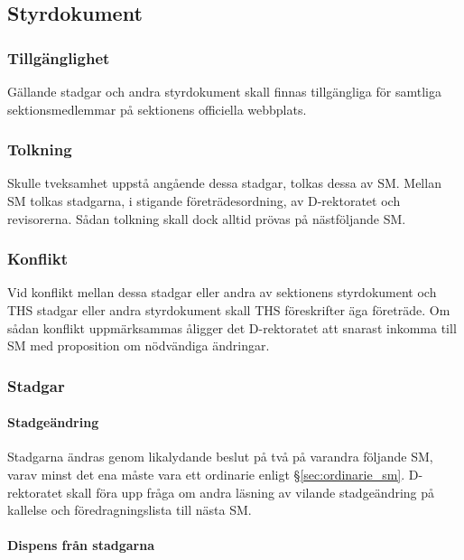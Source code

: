 \documentclass{dgovdoc}
\begin{document}
\subsection{Styrdokument}
\label{sec:styrdokument}

\subsubsection{Tillgänglighet}

Gällande stadgar och andra styrdokument skall finnas tillgängliga för samtliga
sektionsmedlemmar på sektionens officiella webbplats.

\subsubsection{Tolkning}

Skulle tveksamhet uppstå angående dessa stadgar, tolkas dessa av SM. Mellan SM
tolkas stadgarna, i stigande företrädesordning, av D-rektoratet och
revisorerna. Sådan tolkning skall dock alltid prövas på nästföljande SM.

\subsubsection{Konflikt}

Vid konflikt mellan dessa stadgar eller andra av sektionens styrdokument och
THS stadgar eller andra styrdokument skall THS föreskrifter äga företräde. Om
sådan konflikt uppmärksammas åligger det D-rektoratet att snarast inkomma till
SM med proposition om nödvändiga ändringar.

\subsubsection{Stadgar}

\paragraph{Stadgeändring}

Stadgarna ändras genom likalydande beslut på två på varandra följande SM, varav
minst det ena måste vara ett ordinarie enligt \S\ref{sec:ordinarie_sm}.
D-rektoratet skall föra upp fråga om andra läsning av vilande stadgeändring på
kallelse och föredragningslista till nästa SM.

\paragraph{Dispens från stadgarna}
\end{document}
